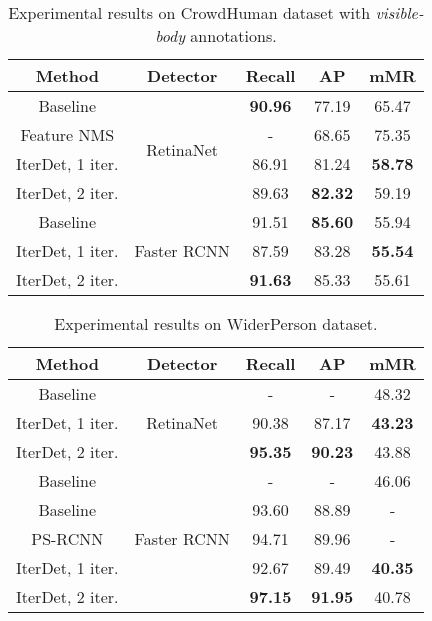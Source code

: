 \documentclass[runningheads]{llncs}
\begin{document}
\begin{table*}[h!]
    \centering
    \begin{tabular}{c|c|ccc}
        \hline
        Method & Detector & Recall & AP & mMR  \\ \hline \hline
        Baseline \cite{shao2018crowdhuman} & \multirow{4}{*}{RetinaNet} & \textbf{90.96} & 77.19 & 65.47 \\
        Feature NMS \cite{salscheider2020featurenms} && - & 68.65 & 75.35 \\ \cline{1-1} \cline{3-5}
        IterDet, 1 iter. && 86.91 & 81.24 & \textbf{58.78} \\
        IterDet, 2 iter. && 89.63 & \textbf{82.32} & 59.19 \\ \hline \hline
        Baseline \cite{shao2018crowdhuman} & \multirow{3}{*}{Faster RCNN} & 91.51 & \textbf{85.60} & 55.94 \\ \cline{1-1} \cline{3-5}
        IterDet, 1 iter. && 87.59 & 83.28 & \textbf{55.54} \\
        IterDet, 2 iter. && \textbf{91.63} & 85.33 & 55.61 \\ \hline
    \end{tabular}
    \caption{Experimental results on CrowdHuman dataset with \emph{visible-body}  annotations.}
    \label{tab:crowd_human_visible}
\end{table*}

\begin{table*}[h!]
    \centering
    \begin{tabular}{c|c|ccc}
        \hline
        Method & Detector & Recall & AP & mMR  \\ \hline \hline
        Baseline \cite{zhang2019widerperson} & \multirow{3}{*}{RetinaNet} & - & - & 48.32 \\ \cline{1-1} \cline{3-5}
        IterDet, 1 iter. && 90.38 & 87.17 & \textbf{43.23} \\
        IterDet, 2 iter. && \textbf{95.35} & \textbf{90.23} & 43.88 \\ \hline \hline
        Baseline \cite{zhang2019widerperson} & \multirow{5}{*}{Faster RCNN} & - & - & 46.06 \\
        Baseline \cite{ge2020ps} && 93.60 & 88.89 & - \\
        PS-RCNN \cite{ge2020ps} && 94.71 & 89.96 & - \\ \cline{1-1} \cline{3-5}
        IterDet, 1 iter. && 92.67 & 89.49 & \textbf{40.35} \\
        IterDet, 2 iter. && \textbf{97.15} & \textbf{91.95} & 40.78 \\ \hline
    \end{tabular}
    \caption{Experimental results on WiderPerson dataset.}
    \label{tab:wider_person}
\end{table*}
\end{document}
